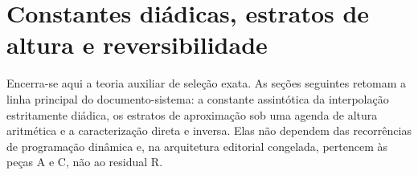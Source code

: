 \part*{Constantes diádicas, estratos de altura e reversibilidade}

Encerra-se aqui a teoria auxiliar de seleção exata. As seções seguintes
retomam a linha principal do documento-sistema: a constante assintótica da
interpolação estritamente diádica, os estratos de aproximação sob uma agenda
de altura aritmética e a caracterização direta e inversa. Elas não dependem
das recorrências de programação dinâmica e, na arquitetura editorial
congelada, pertencem às peças A e C, não ao residual R.
